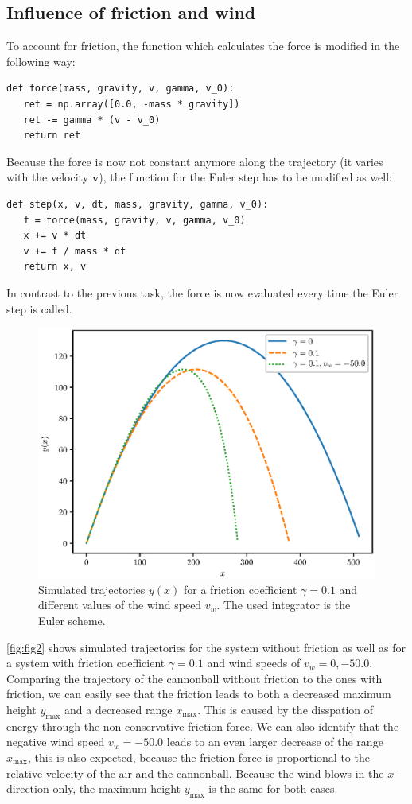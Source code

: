 \documentclass[a4paper,10pt,bibtotoc]{scrartcl}
\begin{document}
\subsection{Influence of friction and wind}
To account for friction, the function which calculates the force is modified in the following way:
\begin{lstlisting}
def force(mass, gravity, v, gamma, v_0):
   ret = np.array([0.0, -mass * gravity])
   ret -= gamma * (v - v_0)
   return ret
\end{lstlisting}
Because the force is now not constant anymore along the trajectory (it varies with the velocity $\mathbf{v}$), the function for the Euler step has to be modified as well:
\begin{lstlisting}
def step(x, v, dt, mass, gravity, gamma, v_0):
   f = force(mass, gravity, v, gamma, v_0)
   x += v * dt
   v += f / mass * dt
   return x, v
\end{lstlisting}
In contrast to the previous task, the force is now evaluated every time the Euler step is called. 

\begin{figure}[H]
 \includegraphics[width=\textwidth]{Figure_2.eps}
 \caption{Simulated trajectories $y(x)$ for a friction coefficient $\gamma=0.1$ and different values of the wind speed $v_w$. The used integrator is the Euler scheme.}
 \label{fig:fig2}
\end{figure}

\noindent\autoref{fig:fig2} shows simulated trajectories for the system without friction as well as for a system with friction coefficient $\gamma = 0.1$ and wind speeds of $v_w=0, -50.0$. Comparing the trajectory of the cannonball without friction to the ones with friction, we can easily see that the friction leads to both a decreased maximum height $y_\mathrm{max}$ and a decreased range $x_\mathrm{max}$. This is caused by the disspation of energy through the non-conservative friction force. We can also identify that the negative wind speed $v_w=-50.0$ leads to an even larger decrease of the range $x_\mathrm{max}$, this is also expected, because the friction force is proportional to the relative velocity of the air and the cannonball. Because the wind blows in the $x$-direction only, the maximum height $y_\mathrm{max}$ is the same for both cases.
\end{document}
